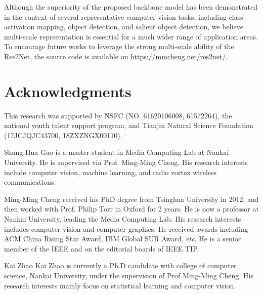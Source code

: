\documentclass[10pt,journal,cspaper,compsoc]{IEEEtran}
\newcommand{\ourM}{{Res2Net}}
\def\etc{\emph{etc}}
\begin{document}
Although the superiority of the proposed backbone model has been demonstrated
in the context of several representative computer vision tasks,
including class activation mapping, object detection,
and salient object detection,
we believe multi-scale representation is essential for a much wider range of
application areas.
%
To encourage future works to leverage the strong multi-scale ability of
the \ourM,
the source code is available on \url{https://mmcheng.net/res2net/}.


\section*{Acknowledgments}
This research was supported by NSFC (NO. 61620106008, 61572264),
the national youth talent support program, and
Tianjin Natural Science Foundation (17JCJQJC43700, 18ZXZNGX00110).



{\small


}



\newcommand{\AddPhoto}[1]{{\texttt{[image: Authors/\#1]}}}

\ifdefined \GramaCheck
  \newcommand{\AuthorBio}[3]{#2 #3}
\else
  \newcommand{\AuthorBio}[3]{\vspace{-.2in}\begin{IEEEbiography}[\AddPhoto{#1}]{#2}#3\end{IEEEbiography}}
\fi


\AuthorBio{shgao}{Shang-Hua Gao}{
is a master student in Media Computing Lab at Nankai University.
He is supervised via Prof. Ming-Ming Cheng.
His research interests include computer vision,  machine learning, 
and radio vortex wireless communications.
}


\AuthorBio{cmm}{Ming-Ming Cheng}{
received his PhD degree from Tsinghua University in 2012,
and then worked with Prof. Philip Torr in Oxford for 2 years.
He is now a professor at Nankai University, leading the
Media Computing Lab.
His research interests includes computer vision and computer graphics.
He received awards including ACM China Rising Star Award,
IBM Global SUR Award, \etc.
He is a senior member of the IEEE and on the editorial boards of IEEE TIP.
}


\AuthorBio{kzhao}{Kai Zhao}{
Kai Zhao is currently a Ph.D candidate with college of computer science, Nankai University, 
under the supervision of Prof Ming-Ming Cheng. 
His research interests mainly focus on statistical learning and computer vision.
}
\end{document}
